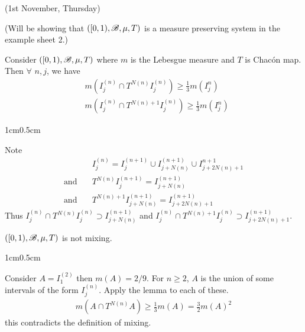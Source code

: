 \documentclass[12pt,a4paper]{report}
\newenvironment{proof}
{\begin{changemargin}{1cm}{0.5cm} 
	}%
	{\end{changemargin}
}
\begin{document}
\digression


\newday

(1st November, Thursday)
\s

(Will be showing that $([0,1), \mathscr{B}, \mu, T)$ is a measure preserving system in the example sheet 2.)
\s

\lem Consider $([0,1), \mathscr{B}, \mu, T)$ where $m$ is the Lebesgue measure and $T$ is Chac\'{o}n map. Then $\forall$ $n,j$, we have
\begin{align*}
& m(I^{(n)}_j \cap T^{N(n)} I^{(n)}_j) \geq \frac{1}{3}m(I_j^{n}) \\
& m(I^{(n)}_j \cap T^{N(n)+1} I^{(n)}_j) \geq \frac{1}{3}m(I_j^{n})
\end{align*}
\begin{proof}
\pf Note 
\begin{align*}
& I_j^{(n)} = I_{j}^{(n+1)} \cup I_{j+N(n)}^{(n+1)} \cup I_{j+2N(n)+1}^{n+1} \\
\text{and} \quad & T^{N(n)} I_j^{(n+1)}  = I^{(n+1)}_{j+N(n)} \\
\text{and} \quad & T^{N(n)+1} I^{(n+1)}_{j+N(n)} = I^{(n+1)}_{j+2N(n)+1}
\end{align*}
Thus $I^{(n)}_j \cap T^{N(n)} I_j^{(n)} \supset I^{(n+1)}_{j+N(n)}$ and $I^{(n)}_j \cap T^{N(n)+1} I^{(n)}_j \supset I^{(n+1)}_{j+2N(n)+1}$.

\eop
\end{proof}
\s

\thm $([0,1), \mathscr{B}, \mu, T)$ is not mixing.
\begin{proof}
\pf Consider $A= I^{(2)}_1$ then $m(A) = 2/9$. For $n\geq 2$, $A$ is the union of some intervals of the form $I^{(n)}_j$. Apply the lemma to each of these.
\begin{align*}
m(A\cap T^{N(n)} A) \geq \frac{1}{3} m(A) = \frac{3}{2} m(A)^2
\end{align*}
this contradicts the definition of mixing.

\eop
\end{proof}
\s
\end{document}
